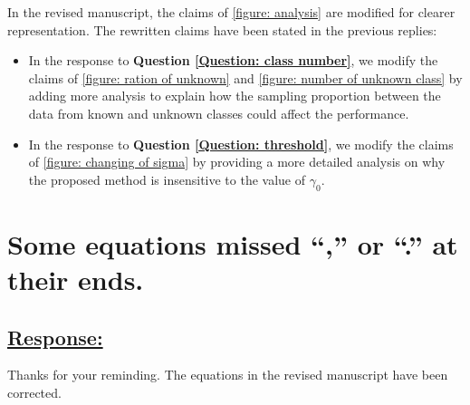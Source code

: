 In the revised manuscript, the claims of \figurename{\ref{figure: analysis}} are modified for clearer representation.
The rewritten claims have been stated in the previous replies:
\begin{itemize}
    \item  In the response to \textbf{Question \ref{Question: class number}}, we modify the claims of \figurename{\ref{figure: ration of unknown}} and \figurename{\ref{figure: number of unknown class}} by adding more analysis to explain how the sampling proportion between the data from known and unknown classes could affect the performance.
    \item In the response to \textbf{Question \ref{Question: threshold}}, we modify the claims of \figurename{\ref{figure: changing of sigma}} by providing a more detailed analysis on why the proposed method is insensitive to the value of $\gamma_0$.
\end{itemize}

\section{Some equations missed ``,'' or ``.'' at their ends.}
\subsection*{\underline{\textbf{Response:}}}

Thanks for your reminding.
The equations in the revised manuscript have been corrected.


